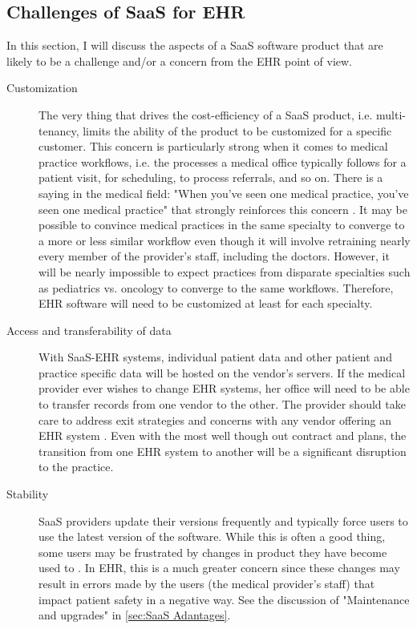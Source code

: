 \documentclass[10pt]{article}
\begin{document}
\subsection{Challenges of SaaS for EHR}
\label{sec:SaaS Challenges}

In this section, I will discuss the aspects of a SaaS software product that are likely to be a challenge and/or a concern from the EHR point of view.

\begin{description}
\item[Customization]
The very thing that drives the cost-efficiency of a SaaS product, i.e. multi-tenancy, limits the ability of the product to be customized for a specific customer.
This concern is particularly strong when it comes to medical practice workflows, i.e. the processes a medical office typically follows for a patient visit, for scheduling, to process referrals, and so on.
There is a saying in the medical field: "When you've seen one medical practice, you've seen one medical practice" that strongly reinforces this concern \cite{health-hack}.
It may be possible to convince medical practices in the same specialty to converge to a more or less similar workflow even though it will involve retraining nearly every member of the provider's staff, including the doctors. 
However, it will be nearly impossible to expect practices from disparate specialties such as pediatrics vs. oncology to converge to the same workflows.
Therefore, EHR software will need to be customized at least for each specialty.

\item[Access and transferability of data]
With SaaS-EHR systems, individual patient data and other patient and practice specific data will be hosted on the vendor's servers.
If the medical provider ever wishes to change EHR systems, her office will need to be able to transfer records from one vendor to the other.
The provider should take care to address exit strategies and concerns with any vendor offering an EHR system \cite{ehr-breakup}.
Even with the most well though out contract and plans, the transition from one EHR system to another will be a significant disruption to the practice.

\item[Stability]
SaaS providers update their versions frequently and typically force users to use the latest version of the software.
While this is often a good thing, some users may be frustrated by changes in product they have become used to \cite{wiki-saas}.
In EHR, this is a much greater concern since these changes may result in errors made by the users (the medical provider's staff) that impact patient safety in a negative way.
See the discussion of "Maintenance and upgrades" in \ref{sec:SaaS Adantages}.

\end{description}
\end{document}
